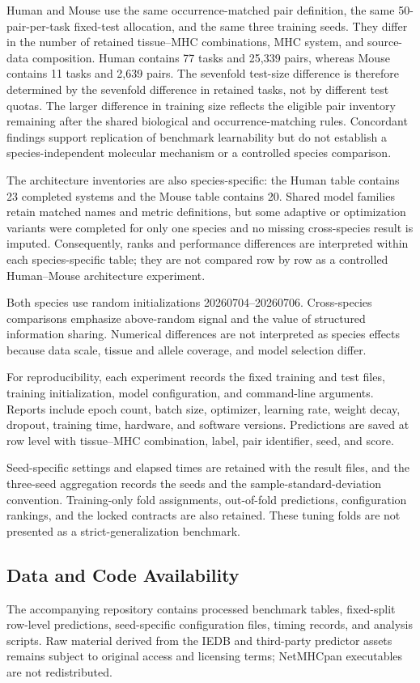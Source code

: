 Human and Mouse use the same occurrence-matched pair definition, the same 50-pair-per-task fixed-test allocation, and the same three training seeds. They differ in the number of retained tissue--MHC combinations, MHC system, and source-data composition. Human contains 77 tasks and 25,339 pairs, whereas Mouse contains 11 tasks and 2,639 pairs. The sevenfold test-size difference is therefore determined by the sevenfold difference in retained tasks, not by different test quotas. The larger difference in training size reflects the eligible pair inventory remaining after the shared biological and occurrence-matching rules. Concordant findings support replication of benchmark learnability but do not establish a species-independent molecular mechanism or a controlled species comparison.

The architecture inventories are also species-specific: the Human table contains 23 completed systems and the Mouse table contains 20. Shared model families retain matched names and metric definitions, but some adaptive or optimization variants were completed for only one species and no missing cross-species result is imputed. Consequently, ranks and performance differences are interpreted within each species-specific table; they are not compared row by row as a controlled Human--Mouse architecture experiment.

Both species use random initializations 20260704--20260706. Cross-species comparisons emphasize above-random signal and the value of structured information sharing. Numerical differences are not interpreted as species effects because data scale, tissue and allele coverage, and model selection differ.

For reproducibility, each experiment records the fixed training and test files, training initialization, model configuration, and command-line arguments. Reports include epoch count, batch size, optimizer, learning rate, weight decay, dropout, training time, hardware, and software versions. Predictions are saved at row level with tissue--MHC combination, label, pair identifier, seed, and score.

Seed-specific settings and elapsed times are retained with the result files, and the three-seed aggregation records the seeds and the sample-standard-deviation convention. Training-only fold assignments, out-of-fold predictions, configuration rankings, and the locked contracts are also retained. These tuning folds are not presented as a strict-generalization benchmark.

\subsection{Data and Code Availability}

The accompanying repository contains processed benchmark tables, fixed-split row-level predictions, seed-specific configuration files, timing records, and analysis scripts. Raw material derived from the IEDB and third-party predictor assets remains subject to original access and licensing terms; NetMHCpan executables are not redistributed.

